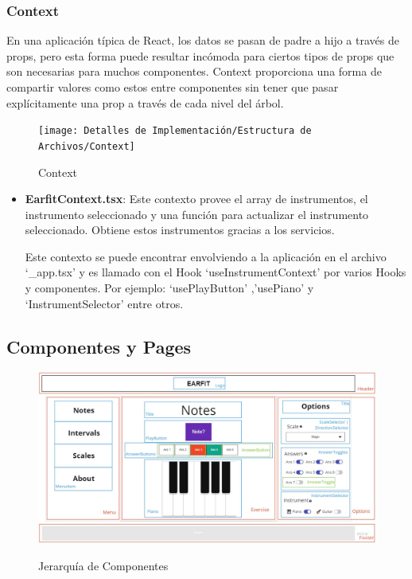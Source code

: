 \documentclass[12pt,twoside,titlepage]{report}
\begin{document}
\subsubsection{Context}

En una aplicación típica de React, los datos se pasan de padre a hijo a través de props, pero esta forma puede resultar incómoda para ciertos tipos de props que son necesarias para muchos componentes. Context proporciona una forma de compartir valores como estos entre componentes sin tener que pasar explícitamente una prop a través de cada nivel del árbol.

\begin{figure}[H]
    \centering
    \texttt{[image: Detalles de Implementación/Estructura de Archivos/Context]}
    \label{fig:Context}
    \caption{Context}
\end{figure}

\begin{itemize}
    \item \textbf{EarfitContext.tsx}: Este contexto provee el array de instrumentos, el instrumento seleccionado y una función para actualizar el instrumento seleccionado. Obtiene estos instrumentos gracias a los servicios.
        
    Este contexto se puede encontrar envolviendo a la aplicación en el archivo ‘\_app.tsx’ y es llamado con el Hook ‘useInstrumentContext’ por varios Hooks y componentes. Por ejemplo: ‘usePlayButton’ ,’usePiano’ y ‘InstrumentSelector’ entre otros.
\end{itemize}

\subsection{Componentes y Pages}
\begin{figure}[H]
    \centering
    \includegraphics[scale=0.28]{Detalles de Implementación/JerarquíaComponentes}
    \label{fig:JerarquíaComponentes}
    \caption{Jerarquía de Componentes}
\end{figure}
\end{document}

